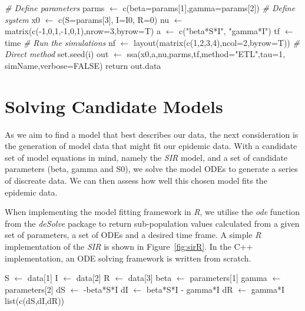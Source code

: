 \begin{algorithm}
  \begin{algorithmic}
    \State \emph{\# Define parameters}
    \State parms $\gets$ c(beta=params[1],gamma=params[2])
    \State
    \State \emph{\# Define system}
    \State x0 $\gets$ c(S=params[3], I=I0, R=0) 
    \State nu $\gets$ matrix(c(-1,0,1,-1,0,1),nrow=3,byrow=T)
    \State a  $\gets$ c("beta*S*I", "gamma*I")  
    \State tf $\gets$ time 
    \State
    \State \emph{\# Run the simulations}
    \State nf $\gets$ layout(matrix(c(1,2,3,4),ncol=2,byrow=T))
    \State
    \State \emph{\# Direct method}
    \State set.seed(i)
    \State out $\gets$ ssa(x0,a,nu,parms,tf,method="ETL",tau=1,
    simName,verbose=FALSE)
    \State return out.data
\EndFunction
       
 
\end{algorithmic}
\end{algorithm}


\section{Solving Candidate Models}
As we aim to find a model that best describes our data, the next
consideration is the generation of model data that might fit our
epidemic data. With a candidate set of model equations in mind,
namely the \emph{SIR} model, and a set of candidate parameters (beta,
gamma and S0), we solve the model ODEs to generate a series of
discreate data. We can then assess how well this chosen model fits the
epidemic data.

When implementing the model fitting
framework in \emph{R}, we utilise the \emph{ode} function from the
\emph{deSolve} package to return sub-population values calculated from a
given set of parameters, a set of ODEs and a desired time frame. A
simple \emph{R} implementation of the \emph{SIR} is shown in
Figure~\ref{fig:sirR}. In the C++ implementation, an ODE solving
framework is written from scratch.

\begin{algorithm}
\label{fig::sirR}
\begin{algorithmic}
  \State S $\gets$ data[1]
  \State I $\gets$ data[2]
  \State R $\gets$ data[3]
  \State
  \State beta $\gets$ parameters[1]
  \State gamma $\gets$ parameters[2]
  \State
  \State dS $\gets$ -beta*S*I
  \State dI $\gets$ beta*S*I - gamma*I
  \State dR $\gets$ gamma*I
  \State
  \State list(c(dS,dI,dR))
  \EndFunction
\end{algorithmic}
\end{algorithm}
  
